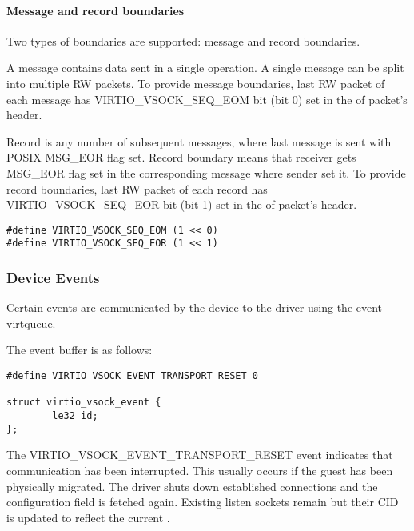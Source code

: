 \paragraph{Message and record boundaries}\label{sec:Device Types / Socket Device / Device Operation / Seqpacket Sockets / Boundaries}
Two types of boundaries are supported: message and record boundaries.

A message contains data sent in a single operation. A single message can be
split into multiple RW packets.
To provide message boundaries, last RW packet of each message has
VIRTIO_VSOCK_SEQ_EOM bit (bit 0) set in the  of packet's header.

Record is any number of subsequent messages, where last message is sent with POSIX
MSG_EOR flag set. Record boundary means that receiver gets MSG_EOR flag set
in the corresponding message where sender set it.
To provide record boundaries, last RW packet of each record has VIRTIO_VSOCK_SEQ_EOR
bit (bit 1) set in the  of packet's header.

\begin{lstlisting}
#define VIRTIO_VSOCK_SEQ_EOM (1 << 0)
#define VIRTIO_VSOCK_SEQ_EOR (1 << 1)
\end{lstlisting}

\subsubsection{Device Events}\label{sec:Device Types / Socket Device / Device Operation / Device Events}

Certain events are communicated by the device to the driver using the event
virtqueue.

The event buffer is as follows:

\begin{lstlisting}
#define VIRTIO_VSOCK_EVENT_TRANSPORT_RESET 0

struct virtio_vsock_event {
        le32 id;
};
\end{lstlisting}

The VIRTIO_VSOCK_EVENT_TRANSPORT_RESET event indicates that communication has
been interrupted.  This usually occurs if the guest has been physically
migrated.  The driver shuts down established connections and the
 configuration field is fetched again.  Existing listen
sockets remain but their CID is updated to reflect the current
.


